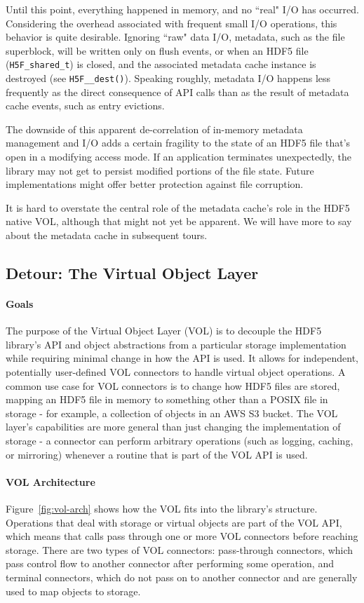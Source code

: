 Until this point, everything happened in memory, and no ``real" I/O has occurred. Considering the overhead associated with frequent small I/O operations, this behavior is quite desirable. Ignoring ``raw" data I/O, metadata, such as the file superblock, will be written only on flush events, or when an HDF5 file (\texttt{H5F\_shared\_t}) is closed, and the associated metadata cache instance is destroyed (see \texttt{H5F\_\_dest()}). Speaking roughly, metadata I/O happens less frequently as the direct consequence of API calls than as the result of metadata cache events, such as entry evictions.

The downside of this apparent de-correlation of in-memory metadata management and I/O adds a certain fragility to the state of an HDF5 file that's open in a modifying access mode. If an application terminates unexpectedly, the library may not get to persist modified portions of the file state. Future implementations might offer better protection against file corruption.

It is hard to overstate the central role of the metadata cache's role in the HDF5 native VOL, although that might not yet be apparent. We will have more to say about the metadata cache in subsequent tours.

\subsection{Detour: The Virtual Object Layer}\label{sec:vol}

\paragraph{Goals} The purpose of the Virtual Object Layer (VOL) is to decouple the HDF5 library's API and object abstractions from a particular storage implementation while requiring minimal change in how the API is used. It allows for independent, potentially user-defined VOL connectors to handle virtual object operations. A common use case for VOL connectors is to change how HDF5 files are stored, mapping an HDF5 file in memory to something other than a POSIX file in storage - for example, a collection of objects in an AWS S3 bucket. The VOL layer's capabilities are more general than just changing the implementation of storage - a connector can perform arbitrary operations (such as logging, caching, or mirroring) whenever a routine that is part of the VOL API is used.

\paragraph{VOL Architecture}  Figure~\ref{fig:vol-arch} shows how the VOL fits into the library's structure. Operations that deal with storage or virtual objects are part of the VOL API, which means that calls pass through one or more VOL connectors before reaching storage. There are two types of VOL connectors: pass-through connectors, which pass control flow to another connector after performing some operation, and terminal connectors, which do not pass on to another connector and are generally used to map objects to storage.

